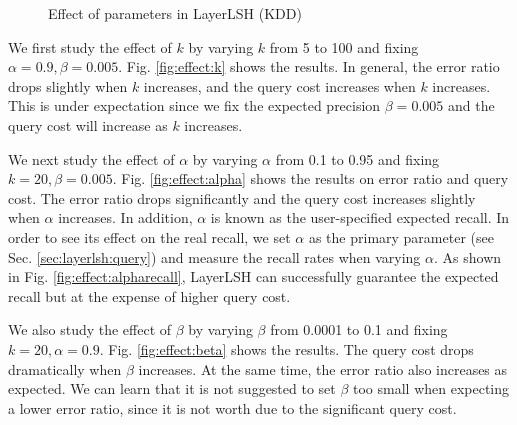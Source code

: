 \begin{figure}[!t]
{{    \label{fig:effect:beta}
    \vspace{-0.05in}}
    \hspace{-5mm}
    }
	\caption{Effect of parameters in LayerLSH (KDD)}
	\label{fig:param}
\vspace{-0.15in}
\end{figure}

We first study the effect of $k$ by varying $k$ from 5 to 100 and fixing $\alpha=0.9, \beta=0.005$. Fig. \ref{fig:effect:k} shows the results. In general, the error ratio drops slightly when $k$ increases, and the query cost increases when $k$ increases. This is under expectation since we fix the expected precision $\beta=0.005$ and the query cost will increase as $k$ increases.

We next study the effect of $\alpha$ by varying $\alpha$ from 0.1 to 0.95 and fixing $k=20, \beta=0.005$. Fig. \ref{fig:effect:alpha} shows the results on error ratio and query cost. The error ratio drops significantly and the query cost increases slightly when $\alpha$ increases. In addition, $\alpha$ is known as the user-specified expected recall. In order to see its effect on the real recall, we set $\alpha$ as the primary parameter (see Sec. \ref{sec:layerlsh:query}) and measure the recall rates when varying $\alpha$. As shown in Fig. \ref{fig:effect:alpharecall}, LayerLSH can successfully guarantee the expected recall but at the expense of higher query cost.

We also study the effect of $\beta$ by varying $\beta$ from 0.0001 to 0.1 and fixing $k=20, \alpha=0.9$. Fig. \ref{fig:effect:beta} shows the results. The query cost drops dramatically when $\beta$ increases. At the same time, the error ratio also increases as expected. We can learn that it is not suggested to set $\beta$ too small when expecting a lower error ratio, since it is not worth due to the significant query cost.

